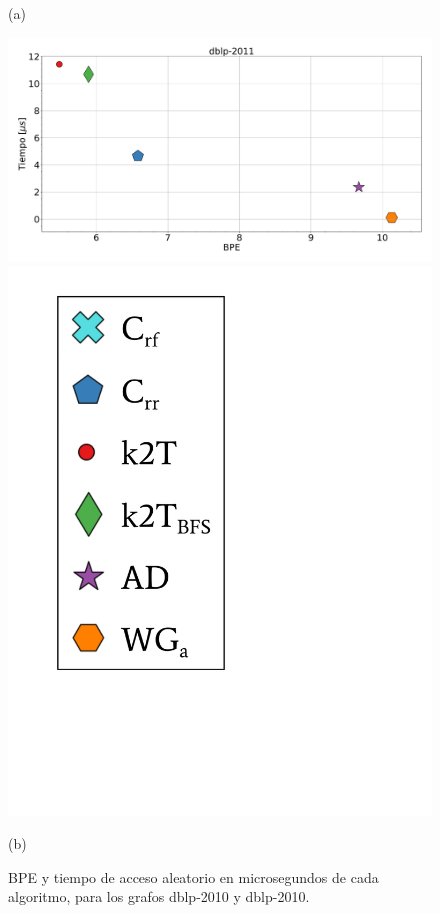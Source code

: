 \begin{figure}
\begin{minipage}{1\textwidth}
    			(a)		
    	\end{minipage}
    	
       	\begin{minipage}{1\textwidth}
    			\centering
    			\begin{minipage}{0.8\textwidth}
    				\centering
    				\includegraphics[width=1\linewidth]{img/bpeTimes/aleatorio/dblp-2011.pdf}
    			\end{minipage}
    			\begin{minipage}{0.15\textwidth}
    				\centering
    				\includegraphics[scale=.24, clip, trim=70 200 300 40]{img/bpeTimes/labelAle.pdf}
    			\end{minipage}
    			
    			(b)		
    	\end{minipage}
    	
    \caption{BPE y tiempo de acceso aleatorio en microsegundos de cada algoritmo, para los grafos dblp-2010 y dblp-2010.}
    \label{fig:bpetAle2}
\end{figure}

